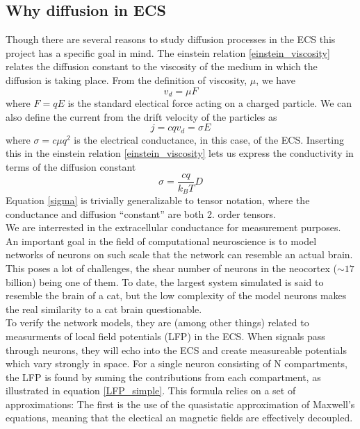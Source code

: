 \documentclass[a4paper,english, 12pt, twoside]{article}
\begin{document}
\subsection{Why diffusion in ECS}
Though there are several reasons to study diffusion processes in the ECS this project has a specific goal in mind. 
The einstein relation \ref{einstein_viscosity} relates the diffusion constant to the viscosity of the medium in which the diffusion is taking place. 
From the definition of viscosity, $\mu$, we have 
\begin{equation}
v_d = \mu F 
\end{equation}
where $F = qE$ is the standard electical force acting on a charged particle. 
We can also define the current from the drift velocity of the particles as 
\begin{equation}
j = cqv_d = \sigma E 
\end{equation}
where $\sigma = c\mu q^2$ is the electrical conductance, in this case, of the ECS. 
Inserting this in the einstein relation \ref{einstein_viscosity} lets us express the conductivity in terms of the diffusion constant 
\begin{equation}\label{sigma}
\sigma = \frac{cq}{k_B T}D 
\end{equation}
Equation \ref{sigma} is trivially generalizable to tensor notation, where the conductance and diffusion ``constant'' are both 2. order tensors.\\
We are interrested in the extracellular conductance for measurement purposes. 
An important goal in the field of computational neuroscience is to model networks of neurons on such scale that the network can resemble an actual brain. 
This poses a lot of challenges, the shear number of neurons in the neocortex ($\sim 17$ billion) being one of them. 
To date, the largest system simulated is said to resemble the brain of a cat, but the low complexity of the model neurons makes the real similarity to a cat brain questionable. \\
To verify the network models, they are (among other things) related to measurments of local field potentials (LFP) in the ECS. 
When signals pass through neurons, they will echo into the ECS and create measureable potentials which vary strongly in space. 
For a single neuron consisting of N compartments, the LFP is found by suming the contributions from each compartment, as illustrated in equation \ref{LFP_simple}. 
This formula relies on a set of approximations: The first is the use of the quasistatic approximation of Maxwell's equations, meaning that the electical an magnetic fields are effectively decoupled. 
\end{document}
